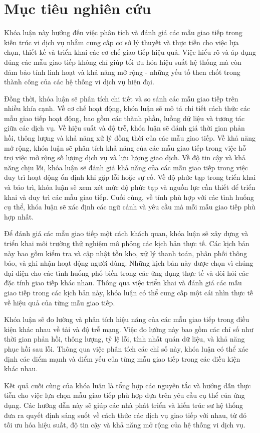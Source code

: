 \section{Mục tiêu nghiên cứu}
Khóa luận này hướng đến việc phân tích và đánh giá các mẫu giao tiếp trong kiến
trúc vi dịch vụ nhằm cung cấp cơ sở lý thuyết và thực tiễn cho việc lựa chọn,
thiết kế và triển khai các cơ chế giao tiếp hiệu quả. Việc hiểu rõ và áp dụng
đúng các mẫu giao tiếp không chỉ giúp tối ưu hóa hiệu suất hệ thống mà còn đảm
bảo tính linh hoạt và khả năng mở rộng - những yếu tố then chốt trong thành
công của các hệ thống vi dịch vụ hiện đại.

Đồng thời, khóa luận sẽ phân tích chi tiết và so sánh các mẫu giao tiếp trên nhiều khía cạnh. Về cơ chế hoạt động, khóa luận sẽ mô tả chi tiết cách thức các mẫu giao tiếp hoạt động, bao gồm các thành phần, luồng dữ liệu và tương tác giữa các dịch vụ. Về hiệu suất và độ trễ, khóa luận sẽ đánh giá thời gian phản hồi, thông lượng và khả năng xử lý đồng thời của các mẫu giao tiếp. Về khả năng mở rộng, khóa luận sẽ phân tích khả năng của các mẫu giao tiếp trong việc hỗ trợ việc mở rộng số lượng dịch vụ và lưu lượng giao dịch. Về độ tin cậy và khả năng chịu lỗi, khóa luận sẽ đánh giá khả năng của các mẫu giao tiếp trong việc duy trì hoạt động ổn định khi gặp lỗi hoặc sự cố. Về độ phức tạp trong triển khai và bảo trì, khóa luận sẽ xem xét mức độ phức tạp và nguồn lực cần thiết để triển khai và duy trì các mẫu giao tiếp. Cuối cùng, về tính phù hợp với các tình huống cụ thể, khóa luận sẽ xác định các ngữ cảnh và yêu cầu mà mỗi mẫu giao tiếp phù hợp nhất.

Để đánh giá các mẫu giao tiếp một cách khách quan, khóa luận sẽ xây dựng và triển khai môi trường thử nghiệm mô phỏng các kịch bản thực tế. Các kịch bản này bao gồm kiểm tra và cập nhật tồn kho, xử lý thanh toán, phân phối thông báo, và ghi nhận hoạt động người dùng. Những kịch bản này được chọn vì chúng đại diện cho các tình huống phổ biến trong các ứng dụng thực tế và đòi hỏi các đặc tính giao tiếp khác nhau. Thông qua việc triển khai và đánh giá các mẫu giao tiếp trong các kịch bản này, khóa luận có thể cung cấp một cái nhìn thực tế về hiệu quả của từng mẫu giao tiếp.

Khóa luận sẽ đo lường và phân tích hiệu năng của các mẫu giao tiếp trong điều
kiện khác nhau về tải và độ trễ mạng. Việc đo lường này bao gồm các chỉ số như
thời gian phản hồi, thông lượng, tỷ lệ lỗi, tính nhất quán dữ liệu, và khả năng
phục hồi sau lỗi. Thông qua việc phân tích các chỉ số này, khóa luận có thể xác
định các điểm mạnh và điểm yếu của từng mẫu giao tiếp trong các điều kiện khác
nhau.

Kết quả cuối cùng của khóa luận là tổng hợp các nguyên tắc và hướng dẫn thực
tiễn cho việc lựa chọn mẫu giao tiếp phù hợp dựa trên yêu cầu cụ thể của ứng
dụng. Các hướng dẫn này sẽ giúp các nhà phát triển và kiến trúc sư hệ thống đưa
ra quyết định sáng suốt về cách thức các dịch vụ giao tiếp với nhau, từ đó tối
ưu hóa hiệu suất, độ tin cậy và khả năng mở rộng của hệ thống vi dịch vụ.